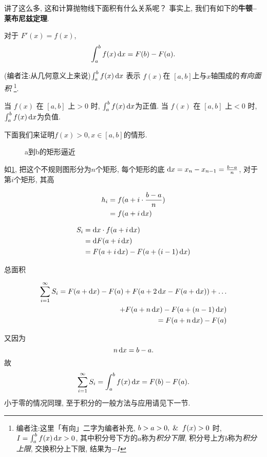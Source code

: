 讲了这么多, 这和计算抛物线下面积有什么关系呢？
事实上, 我们有如下的\textbf{牛顿--莱布尼兹定理}.

\begin{theorem}[牛顿--莱布尼兹定理]
  对于 $F'(x) = f(x)$,
  \[
    \int _{a} ^{b} f(x) \mathop{}\!\mathrm{d} x = F(b) - F(a)
  .\]
\end{theorem}

(编者注:从几何意义上来说)$\int _a^b f(x) \mathop{}\!\mathrm{d} x$ 表示 $f(x)$在 $[a,b]$上与$x$轴围成的\emph{有向面积}
\footnote{编者注:这里「有向」二字为编者补充, $b>a>0,\And f(x)>0$ 时, $I = \int _a ^b
  f(x) \mathop{}\!\mathrm{d} x >0$,
其中积分号下方的$a$称为\emph{积分下限}, 积分号上方$b$称为\emph{积分上限}, 交换积分上下限, 结果为$-I$}.

当 $f(x)$ 在 $[a,b]$ 上$>0$ 时, $\int _a ^{b} f(x) \mathop{}\!\mathrm{d} x $为正值.
当 $f(x)$ 在 $[a,b]$ 上$<0$ 时, $\int _a ^{b} f(x) \mathop{}\!\mathrm{d} x $为负值.

下面我们来证明$f(x)> 0,x \in [a,b]$的情形.

\begin{figure}[htbp]
  \centering
    
  \caption{a到b的矩形逼近}\label{fig:absim}
\end{figure}

如\cref{fig:absim}, 把这个不规则图形分为$n$个矩形,
每个矩形的底 $\mathop{}\!\mathrm{d} x = x_n - x_{n-1} =\frac{b-a}{n}$,
对于第$i$个矩形, 其高

\begin{align*}
  h_i & = f(a+ i \cdot \frac{b-a}{n}) \\
  & = f(a+ i \mathop{}\!\mathrm{d} x)
\end{align*}

\begin{align*}
  S_i & = \mathop{}\!\mathrm{d} x \cdot f(a+i \mathop{}\!\mathrm{d} x)         \\
  & = \mathop{}\!\mathrm{d} F(a+i\mathop{}\!\mathrm{d} x)                  \\
  & = F(a+ i \mathop{}\!\mathrm{d} x) - F(a+(i-1) \mathop{}\!\mathrm{d} x)
\end{align*}

总面积

\begin{align*}
  \sum_{i=1}^{\infty} S_i  = F(a+\mathop{}\!\mathrm{d} x ) - F(a) + F(a+2 \mathop{}\!\mathrm{d} x -
  F(a+\mathop{}\!\mathrm{d} x )) +\ldots \\
  + F(a+n\mathop{}\!\mathrm{d} x) - F(a+ (n-1)\mathop{}\!\mathrm{d} x)
  \notag                \\
  = F(a+n \mathop{}\!\mathrm{d} x) - F(a)
\end{align*}

又因为
\[
  n\mathop{}\!\mathrm{d} x = b-a
.\]
故
\[
  \sum_{i=1}^{\infty} S_i = \int _a^{b} f(x) \mathop{}\!\mathrm{d} x = F(b) - F(a)
.\]
小于零的情况同理, 至于积分的一般方法与应用请见下一节.

